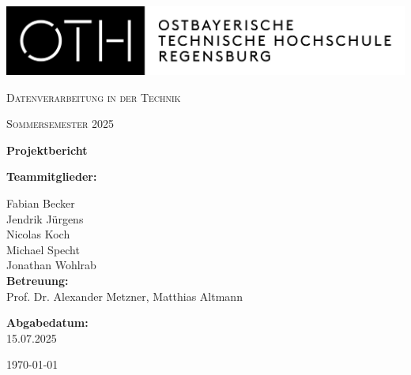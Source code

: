 \begin{titlepage}
    \begin{flushleft}
        \includegraphics[width=.6\textwidth]{./images/oth.png}
    \end{flushleft}

    \vspace*{2cm}

    \centering
    {\scshape\Large Datenverarbeitung in der Technik \par}
    \vspace{0.5cm}
    {\scshape Sommersemester 2025 \par}
    \vspace{0.5cm}
    {\huge\bfseries Projektbericht \par}
    \vspace{3cm}

    \begin{flushleft}
        \large
        \textbf{Teammitglieder:} \\
        \vspace{0.5cm}

        Fabian Becker\hfill \\[0.5cm]
        Jendrik Jürgens\hfill \\[0.5cm]
        Nicolas Koch\hfill \\[0.5cm]
        Michael Specht\hfill \\[0.5cm]
        Jonathan Wohlrab\hfill \\[1cm]

        \textbf{Betreuung:} \\
        Prof. Dr. Alexander Metzner, Matthias Altmann \\
        \vspace{0.5cm}

        \textbf{Abgabedatum:} \\
        15.07.2025 \\
    \end{flushleft}

    \vfill
    \centering
    {\large \today\par}
\end{titlepage}
